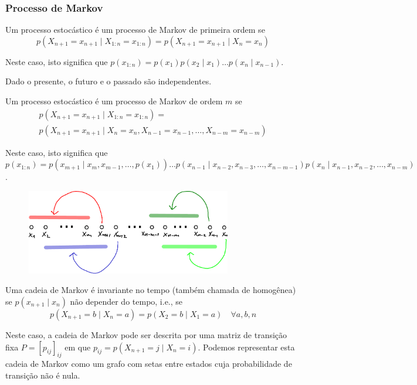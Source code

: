 \begin{frame}[allowframebreaks]
  \frametitle{Processo de Markov}

  \begin{definition}
  Um processo estocástico é um processo de Markov de primeira ordem se
	\begin{equation}
	p(X_{n+1} = x_{n+1} \mid X_{1:n} = x_{1:n}) = p(X_{n+1} = x_{n+1} \mid X_n = x_n)
	\end{equation}
  \end{definition}
  Neste caso, isto significa que $p(x_{1:n}) = p(x_1)p(x_2 \mid x_1) \ldots p(x_n \mid x_{n-1})$.

  Dado o presente, o futuro e o passado são independentes.


  \begin{definition}
  Um processo estocástico é um processo de Markov de ordem $m$ se
        \begin{eqnarray}
        p(X_{n+1} = x_{n+1} \mid X_{1:n} = x_{1:n}) = \nonumber \\
	p(X_{n+1} = x_{n+1} \mid X_n = x_n, X_{n-1} = x_{n-1}, \ldots , X_{n-m} = x_{n-m})
        \end{eqnarray}
  \end{definition}
  Neste caso, isto significa que $p(x_{1:n}) = p(x_{m+1} \mid x_{m}, x_{m-1}, \ldots, p(x_1)) \ldots p(x_{n-1} \mid x_{n-2}, x_{n-3}, \ldots, x_{n-m-1})  p(x_n \mid x_{n-1}, x_{n-2}, \ldots, x_{n-m})$.

        \begin{figure}[h!]
        \centering
        \includegraphics[width=0.8\textwidth]{images/markov-morder.pdf}
        \label{fig:markov-morder}
        \end{figure}

   \framebreak

   \begin{definition}[Homogêneo]
   Uma cadeia de Markov é invariante no tempo (também chamada de homogênea) se $p(x_{n+1} \mid x_n)$ não
   depender do tempo, i.e., se
	\begin{equation}
	p(X_{n+1} = b \mid X_{n} = a) = p(X_2 = b \mid X_1 = a) \quad \forall a,b,n
	\end{equation}   
   \end{definition}
   Neste caso, a cadeia de Markov pode ser descrita por uma matriz de transição fixa $P = [p_{ij}]_{ij}$
   em que $p_{ij} = p(X_{n+1} = j \mid X_{n} = i)$. Podemos representar esta cadeia de Markov como um grafo 
   com setas entre estados cuja probabilidade de transição não é nula.


\end{frame}
